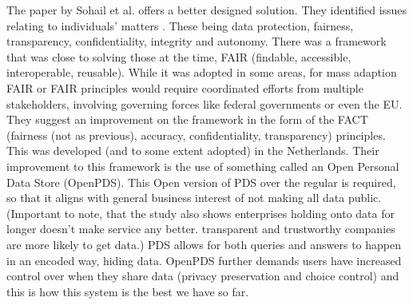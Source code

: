 \documentclass[a4paper,11pt]{report} %
\theoremstyle{change}
\theoremstyle{theoremstyle}
\begin{document}
The paper by Sohail et al. offers a better designed solution. They identified issues relating to individuals' matters \cite{sohail2024data}. These being data protection, fairness, transparency, confidentiality, integrity and autonomy. There was a framework that was close to solving those at the time, FAIR (findable, accessible, interoperable, reusable). While it was adopted in some areas, for mass adaption FAIR or FAIR principles would require coordinated efforts from multiple stakeholders, involving governing forces like federal governments or even the EU. They suggest an improvement on the framework in the form of the FACT (fairness (not as previous), accuracy, confidentiality, transparency) principles. This was developed (and to some extent adopted) in the Netherlands. Their improvement to this framework is the use of something called an Open Personal Data Store (OpenPDS). This Open version of PDS over the regular is required, so that it aligns with general business interest of not making all data public. (Important to note, that the study also shows enterprises holding onto data for longer doesn't make service any better. transparent and trustworthy companies are more likely to get data.) PDS allows for both queries and answers to happen in an encoded way, hiding data. OpenPDS further demands users have increased control over when they share data (privacy preservation and choice control) and this is how this system is the best we have so far.
\end{document}
